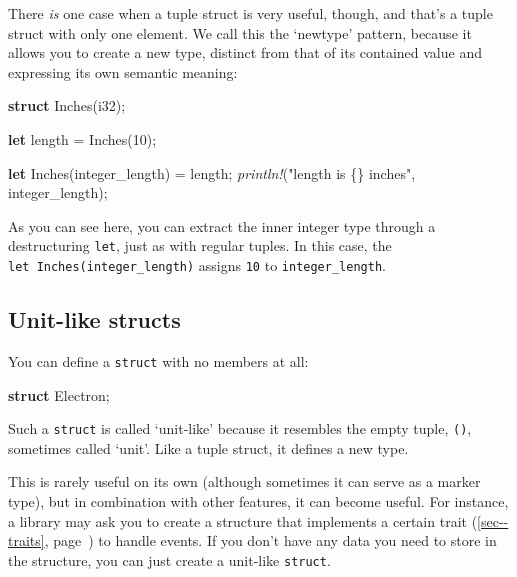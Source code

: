 \documentclass[a4paper,]{book}
\renewcommand*{\hyperref}[2][\ar]{%
  \def\ar{#2}%
  #2 (\autoref{#1}, page~\pageref{#1})}
\newenvironment{Shaded}{\begin{snugshade}}{\end{snugshade}}
\newcommand{\KeywordTok}[1]{\textcolor[rgb]{0.13,0.29,0.53}{\textbf{{#1}}}}
\newcommand{\DataTypeTok}[1]{\textcolor[rgb]{0.13,0.29,0.53}{{#1}}}
\newcommand{\DecValTok}[1]{\textcolor[rgb]{0.00,0.00,0.81}{{#1}}}
\newcommand{\StringTok}[1]{\textcolor[rgb]{0.31,0.60,0.02}{{#1}}}
\newcommand{\PreprocessorTok}[1]{\textcolor[rgb]{0.56,0.35,0.01}{\textit{{#1}}}}
\newcommand{\NormalTok}[1]{{#1}}
\begin{document}
There \emph{is} one case when a tuple struct is very useful, though, and
that's a tuple struct with only one element. We call this the `newtype'
pattern, because it allows you to create a new type, distinct from that
of its contained value and expressing its own semantic meaning:

\begin{Shaded}
\begin{Highlighting}[]
\KeywordTok{struct} \NormalTok{Inches(}\DataTypeTok{i32}\NormalTok{);}

\KeywordTok{let} \NormalTok{length = Inches(}\DecValTok{10}\NormalTok{);}

\KeywordTok{let} \NormalTok{Inches(integer_length) = length;}
\PreprocessorTok{println!}\NormalTok{(}\StringTok{"length is \{\} inches"}\NormalTok{, integer_length);}
\end{Highlighting}
\end{Shaded}

As you can see here, you can extract the inner integer type through a
destructuring \texttt{let}, just as with regular tuples. In this case,
the \texttt{let\ Inches(integer\_length)} assigns \texttt{10} to
\texttt{integer\_length}.

\subsection{Unit-like structs}\label{unit-like-structs}

You can define a \texttt{struct} with no members at all:

\begin{Shaded}
\begin{Highlighting}[]
\KeywordTok{struct} \NormalTok{Electron;}
\end{Highlighting}
\end{Shaded}

Such a \texttt{struct} is called `unit-like' because it resembles the
empty tuple, \texttt{()}, sometimes called `unit'. Like a tuple struct,
it defines a new type.

This is rarely useful on its own (although sometimes it can serve as a
marker type), but in combination with other features, it can become
useful. For instance, a library may ask you to create a structure that
implements a certain \hyperref[sec--traits]{trait} to handle events. If
you don't have any data you need to store in the structure, you can just
create a unit-like \texttt{struct}.

\end{document}
